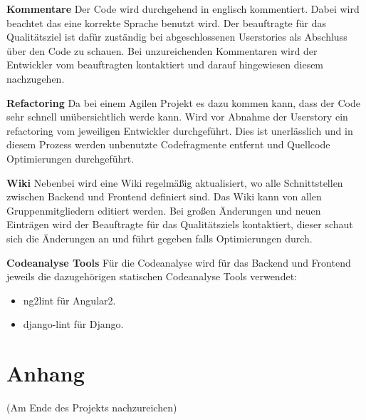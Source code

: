 \documentclass[accentcolor=tud0b,12pt,paper=a4]{tudreport}
\begin{document}
\textbf{Kommentare}
Der Code wird durchgehend in englisch kommentiert. Dabei wird beachtet das eine korrekte Sprache benutzt wird. Der beauftragte für das Qualitätsziel ist dafür zuständig bei abgeschlossenen Userstories als Abschluss über den Code zu schauen. Bei unzureichenden Kommentaren wird der Entwickler vom beauftragten kontaktiert und darauf hingewiesen diesem nachzugehen.

\textbf{Refactoring}
Da bei einem Agilen Projekt es dazu kommen kann, dass der Code sehr schnell unübersichtlich werde kann. Wird vor Abnahme der Userstory ein refactoring vom jeweiligen Entwickler durchgeführt. Dies ist unerlässlich und in diesem Prozess werden unbenutzte Codefragmente entfernt und Quellcode Optimierungen durchgeführt.

\textbf{Wiki}
Nebenbei wird eine Wiki regelmäßig aktualisiert, wo alle Schnittstellen zwischen Backend und Frontend definiert sind. Das Wiki kann von allen Gruppenmitgliedern editiert werden. Bei großen Änderungen und neuen Einträgen wird der Beauftragte für das Qualitätsziels kontaktiert, dieser schaut sich die Änderungen an und führt gegeben falls Optimierungen durch.

\textbf{Codeanalyse Tools}
Für die Codeanalyse wird für das Backend und Frontend jeweils die dazugehörigen statischen Codeanalyse Tools verwendet:
\begin{itemize}
	\item ng2lint für Angular2.
	\item django-lint für Django.
\end{itemize}





\appendix
	\chapter{Anhang}
		(Am Ende des Projekts nachzureichen)\\
\end{document}
